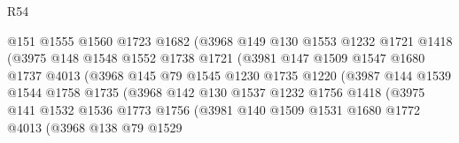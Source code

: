 \begin{lexlean}{R54}
\begin{coremodule}
                            @151
                            @1555
                            @1560
                            @1723
                            @1682
                            (@3968
                              @149
                              @130
                              @1553
                              @1232
                              @1721
                              @1418
                              (@3975
                                @148
                                @1548
                                @1552
                                @1738
                                @1721
                                (@3981
                                  @147
                                  @1509
                                  @1547
                                  @1680
                                  @1737
                                  @4013
                                  (@3968
                                    @145
                                    @79
                                    @1545
                                    @1230
                                    @1735
                                    @1220
                                    (@3987
                                      @144
                                      @1539
                                      @1544
                                      @1758
                                      @1735
                                      (@3968
                                        @142
                                        @130
                                        @1537
                                        @1232
                                        @1756
                                        @1418
                                        (@3975
                                          @141
                                          @1532
                                          @1536
                                          @1773
                                          @1756
                                          (@3981
                                            @140
                                            @1509
                                            @1531
                                            @1680
                                            @1772
                                            @4013
                                            (@3968
                                              @138
                                              @79
                                              @1529

\end{coremodule}
\end{lexlean}
